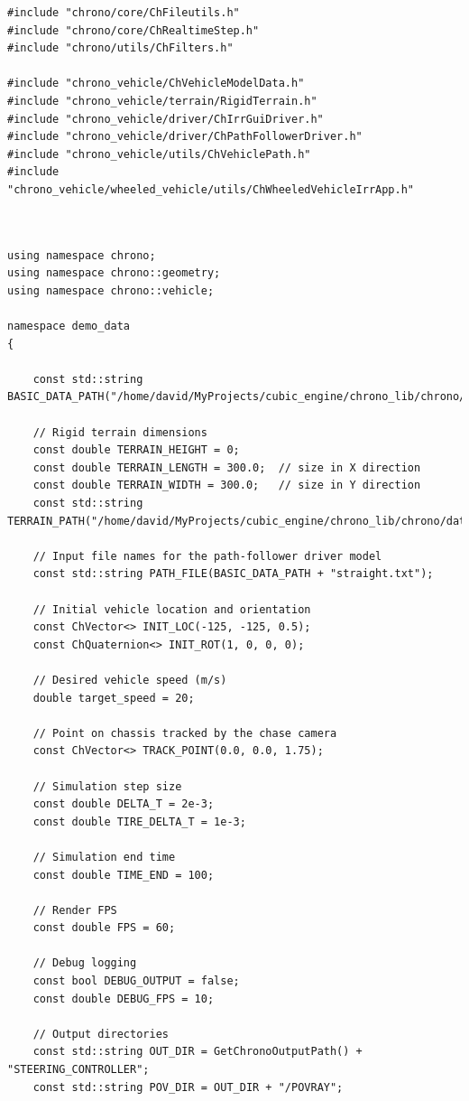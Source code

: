\begin{lstlisting}
#include "chrono/core/ChFileutils.h"
#include "chrono/core/ChRealtimeStep.h"
#include "chrono/utils/ChFilters.h"

#include "chrono_vehicle/ChVehicleModelData.h"
#include "chrono_vehicle/terrain/RigidTerrain.h"
#include "chrono_vehicle/driver/ChIrrGuiDriver.h"
#include "chrono_vehicle/driver/ChPathFollowerDriver.h"
#include "chrono_vehicle/utils/ChVehiclePath.h"
#include "chrono_vehicle/wheeled_vehicle/utils/ChWheeledVehicleIrrApp.h"
\end{lstlisting}

\begin{lstlisting}


using namespace chrono;
using namespace chrono::geometry;
using namespace chrono::vehicle;

namespace demo_data
{

    const std::string BASIC_DATA_PATH("/home/david/MyProjects/cubic_engine/chrono_lib/chrono/data/vehicle/paths/");

    // Rigid terrain dimensions
    const double TERRAIN_HEIGHT = 0;
    const double TERRAIN_LENGTH = 300.0;  // size in X direction
    const double TERRAIN_WIDTH = 300.0;   // size in Y direction
    const std::string TERRAIN_PATH("/home/david/MyProjects/cubic_engine/chrono_lib/chrono/data/vehicle/terrain/textures/tile4.jpg");

    // Input file names for the path-follower driver model
    const std::string PATH_FILE(BASIC_DATA_PATH + "straight.txt");

    // Initial vehicle location and orientation
    const ChVector<> INIT_LOC(-125, -125, 0.5);
    const ChQuaternion<> INIT_ROT(1, 0, 0, 0);

    // Desired vehicle speed (m/s)
    double target_speed = 20;

    // Point on chassis tracked by the chase camera
    const ChVector<> TRACK_POINT(0.0, 0.0, 1.75);

    // Simulation step size
    const double DELTA_T = 2e-3;
    const double TIRE_DELTA_T = 1e-3;

    // Simulation end time
    const double TIME_END = 100;

    // Render FPS
    const double FPS = 60;

    // Debug logging
    const bool DEBUG_OUTPUT = false;
    const double DEBUG_FPS = 10;

    // Output directories
    const std::string OUT_DIR = GetChronoOutputPath() + "STEERING_CONTROLLER";
    const std::string POV_DIR = OUT_DIR + "/POVRAY";


\end{lstlisting}
